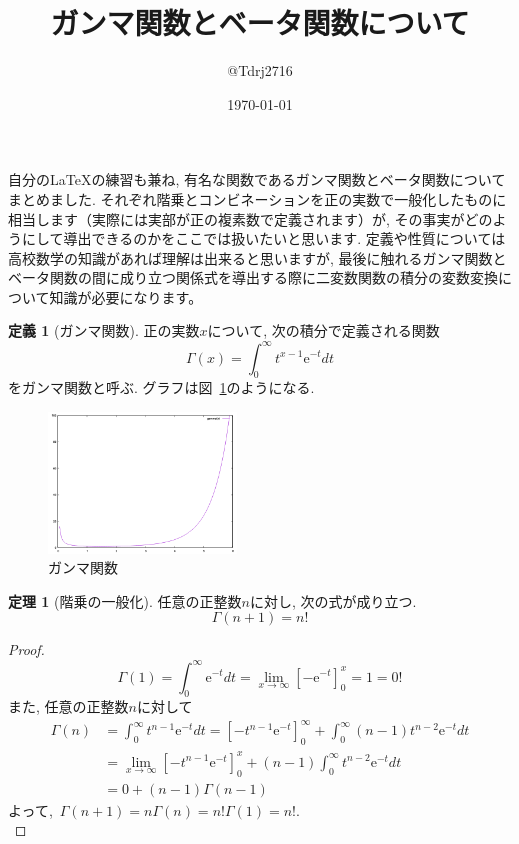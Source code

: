 \documentclass[a4paper,12pt,uplatex,dvipdfmx]{jsarticle}
\theoremstyle{definition}
\newtheorem{definition}{定義}
\newtheorem{theorem}{定理}
\begin{document}
\title{ガンマ関数とベータ関数について}
\author{@Tdrj2716}
\date{\today}
\maketitle

自分の\LaTeX の練習も兼ね, 有名な関数であるガンマ関数とベータ関数についてまとめました. それぞれ階乗とコンビネーションを正の実数で一般化したものに相当します（実際には実部が正の複素数で定義されます）が, その事実がどのようにして導出できるのかをここでは扱いたいと思います. 定義や性質については高校数学の知識があれば理解は出来ると思いますが, 最後に触れるガンマ関数とベータ関数の間に成り立つ関係式を導出する際に二変数関数の積分の変数変換について知識が必要になります。\\

\begin{definition}[ガンマ関数]
    正の実数$x$について, 次の積分で定義される関数
    \[
        \Gamma(x) = \int_0^\infty t^{x-1}\mathrm{e}^{-t} dt
    \]
    をガンマ関数と呼ぶ. グラフは図~\ref{fig:gamma}のようになる.
\end{definition}

\begin{figure}[ht]
    \begin{center}
        \includegraphics[clip, width=5cm]{gamma.png}
        \caption{ガンマ関数}
        \label{fig:gamma}
    \end{center}
\end{figure}

\newpage
\begin{theorem}[階乗の一般化]
    任意の正整数$n$に対し, 次の式が成り立つ.
    \[
        \Gamma(n+1) = n!
    \]
\end{theorem}
\begin{proof}
    \[
        \Gamma(1) = \int_0^\infty \mathrm{e}^{-t} dt = \lim_{x \to \infty} [-\mathrm{e}^{-t}]_0^x = 1 = 0!
    \]
    また, 任意の正整数$n$に対して
    \begin{align*}
        \Gamma(n) & = \int_0^\infty t^{n-1}\mathrm{e}^{-t} dt = [-t^{n-1}\mathrm{e}^{-t}]_0^{\infty} + \int_0^\infty (n-1)t^{n-2}\mathrm{e}^{-t} dt \\
        & = \lim_{x \to \infty}[-t^{n-1}\mathrm{e}^{-t}]_0^x + (n-1)\int_0^\infty t^{n-2}\mathrm{e}^{-t} dt \\
        & =  0 + (n-1)\Gamma(n-1) 
    \end{align*}
    よって,~$\Gamma(n+1) = n\Gamma(n) = n!\Gamma(1) = n!$. \qedhere\\
\end{proof}
 
\end{document}
